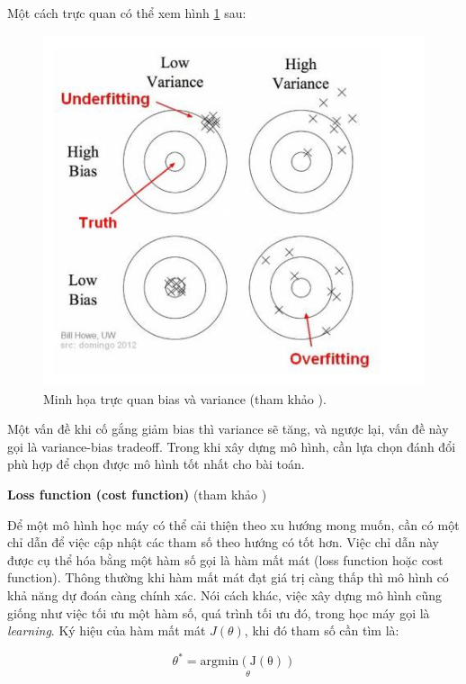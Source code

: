 Một cách trực quan có thể xem hình \ref{fig:bias} sau:
\begin{figure}[!ht]
    \begin{center}
        \includegraphics[width=\linewidth]{asset/image/bias.png}
        \caption{Minh họa trực quan bias và variance (tham khảo \cite{breiman1996bias}). }
        \label{fig:bias}
    \end{center}
\end{figure}

Một vấn đề khi cố gắng giảm bias thì variance sẽ tăng, và ngược lại, vấn đề này gọi là variance-bias tradeoff. Trong khi xây dựng mô hình, cần lựa chọn đánh đổi phù hợp để chọn được mô hình tốt nhất cho bài toán.

\textbf{Loss function (cost function)} (tham khảo \cite{tiep2018machine})

Để một mô hình học máy có thể cải thiện theo xu hướng mong muốn, cần có một chỉ dẫn để việc cập nhật các tham số theo hướng có tốt hơn. Việc chỉ dẫn này được cụ thể hóa bằng một hàm số gọi là hàm mất mát (loss function hoặc cost function). Thông thường khi hàm mất mát đạt giá trị càng thấp thì mô hình có khả năng dự đoán càng chính xác. Nói cách khác, việc xây dựng mô hình cũng giống như việc tối ưu một hàm số, quá trình tối ưu đó, trong học máy gọi là \textit{learning}. Ký hiệu của hàm mất mát $J(\theta)$, khi đó tham số cần tìm là:

\begin{equation}
    \theta ^* = \underset{\theta}{\operatorname{argmin(J(\theta))}}
\end{equation}


